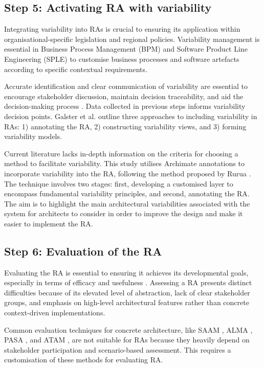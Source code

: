 \documentclass{ieeeaccess}
\begin{document}
\subsection{Step 5: Activating RA with variability}

Integrating variability into RAs is crucial to ensuring its application within organisational-specific legislation and regional policies. Variability management is essential in Business Process Management (BPM) and Software Product Line Engineering (SPLE) to customise business processes and software artefacts according to specific contextual requirements.

Accurate identification and clear communication of variability are essential to encourage stakeholder discussion, maintain decision traceability, and aid the decision-making process \cite{czarnecki2012cool}. Data collected in previous steps informs variability decision points. Galster et al. \cite{GALSTER2011Empirically} outline three approaches to including variability in RAs: 1) annotating the RA, 2) constructing variability views, and 3) forming variability models.

Current literature lacks in-depth information on the criteria for choosing a method to facilitate variability. This study utilises Archimate annotations to incorporate variability into the RA, following the method proposed by Rurua \cite{rurua2019representing}. The technique involves two stages: first, developing a customised layer to encompass fundamental variability principles, and second, annotating the RA. The aim is to highlight the main architectural variabilities associated with the system for architects to consider in order to improve the design and make it easier to implement the RA.

\subsection{Step 6: Evaluation of the RA}

Evaluating the RA is essential to ensuring it achieves its developmental goals, especially in terms of efficacy and usefulness \cite{Galster2011}. Assessing a RA presents distinct difficulties because of its elevated level of abstraction, lack of clear stakeholder groups, and emphasis on high-level architectural features rather than concrete context-driven implementations.

Common evaluation techniques for concrete architecture, like SAAM \cite{kazman1994saam}, ALMA \cite{Bengtsson2004}, PASA \cite{Williams2002}, and ATAM \cite{KazmanATAM}, are not suitable for RAs because they heavily depend on stakeholder participation and scenario-based assessment. This requires a customisation of these methods for evaluating RA.
\end{document}
